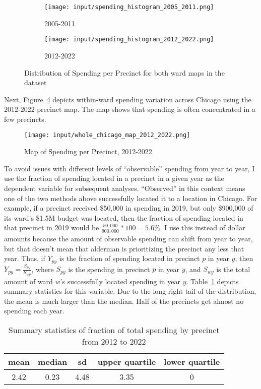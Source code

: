 \begin{figure}[H]
    \centering
    \begin{subfigure}[b]{0.45\textwidth} %
      \texttt{[image: input/spending\_histogram\_2005\_2011.png]}
      \caption{2005-2011}
      \label{fig:sub1}
    \end{subfigure}
    \hfill %
    \begin{subfigure}[b]{0.45\textwidth}
      \texttt{[image: input/spending\_histogram\_2012\_2022.png]}
      \caption{2012-2022}
      \label{fig:sub2}
    \end{subfigure}
  
    \caption{Distribution of Spending per Precinct for both ward maps in the dataset}
    \label{fig:spending_hist}
  \end{figure}

Next, Figure~\ref{fig:spending_map} depicts within-ward spending variation across Chicago using the 2012-2022 precinct map. 
The map shows that spending is often concentrated in a few precincts.

\begin{figure}[H]
    \centering
    \texttt{[image: input/whole\_chicago\_map\_2012\_2022.png]}
    \caption{Map of Spending per Precinct, 2012-2022}
    \label{fig:spending_map}
\end{figure}

To avoid issues with different levels of ``observable'' spending from year to year, I use the fraction of spending located in a precinct in a given year as the dependent variable for subsequent analyses.
``Observed'' in this context means one of the two methods above successfully located it to a location in Chicago.
For example, if a precinct received \$50,000 in spending in 2019, but only \$900,000 of its ward's \$1.5M budget was located, then the fraction of spending located in that precinct in 2019  would be $\frac{50,000}{900,000}*100 =5.6\%$.
I use this instead of dollar amounts because the amount of observable spending can shift from year to year, but that doesn't mean that alderman is prioritizing the precinct any less that year.
Thus, if $Y_{py}$ is the fraction of spending located in precinct $p$ in year $y$, then $Y_{py} = \frac{S_{py}}{S_{wy}}$, where $S_{py}$ is the spending in precinct $p$ in year $y$, and $S_{wy}$ is the total amount of ward $w$'s successfully located spending in year $y$.
Table~\ref{summary_stats} depicts summary statistics for this variable.
Due to the long right tail of the distribution, the mean is much larger than the median.
Half of the precincts get almost no spending each year.

\begin{table}[H]
\caption{Summary statistics of fraction of total spending by precinct from 2012 to 2022}\label{summary_stats}
\centering
\begin{tabular}[t]{ccccc}
\toprule
mean & median & sd & upper quartile & lower quartile\\
\midrule
2.42 & 0.23 & 4.48 & 3.35 & 0\\
\bottomrule
\end{tabular}
\end{table}